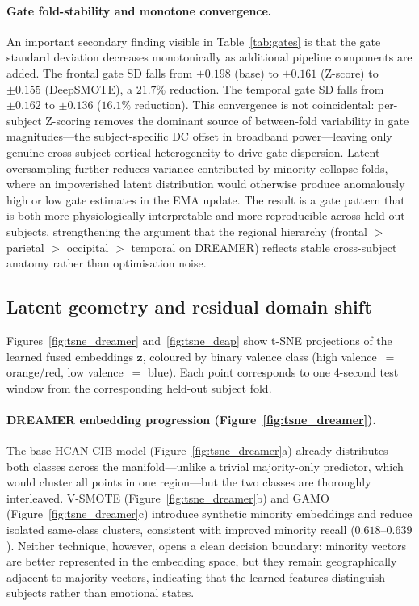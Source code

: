 \documentclass[a4paper,fleqn]{cas-sc}
\begin{document}
\paragraph{Gate fold-stability and monotone convergence.}
An important secondary finding visible in Table~\ref{tab:gates} is that the gate standard deviation decreases monotonically as additional pipeline components are added. The frontal gate SD falls from $\pm0.198$ (base) to $\pm0.161$ (Z-score) to $\pm0.155$ (DeepSMOTE), a $21.7\%$ reduction. The temporal gate SD falls from $\pm0.162$ to $\pm0.136$ ($16.1\%$ reduction). This convergence is not coincidental: per-subject Z-scoring removes the dominant source of between-fold variability in gate magnitudes---the subject-specific DC offset in broadband power---leaving only genuine cross-subject cortical heterogeneity to drive gate dispersion. Latent oversampling further reduces variance contributed by minority-collapse folds, where an impoverished latent distribution would otherwise produce anomalously high or low gate estimates in the EMA update. The result is a gate pattern that is both more physiologically interpretable and more reproducible across held-out subjects, strengthening the argument that the regional hierarchy (frontal $>$ parietal $>$ occipital $>$ temporal on DREAMER) reflects stable cross-subject anatomy rather than optimisation noise.

\FloatBarrier

\subsection{Latent geometry and residual domain shift}

Figures~\ref{fig:tsne_dreamer} and~\ref{fig:tsne_deap} show t-SNE projections of the learned fused embeddings $\mathbf{z}$, coloured by binary valence class (high valence~$=$ orange/red, low valence~$=$ blue). Each point corresponds to one 4-second test window from the corresponding held-out subject fold.

\paragraph{DREAMER embedding progression (Figure~\ref{fig:tsne_dreamer}).}
The base HCAN-CIB model (Figure~\ref{fig:tsne_dreamer}a) already distributes both classes across the manifold---unlike a trivial majority-only predictor, which would cluster all points in one region---but the two classes are thoroughly interleaved. V-SMOTE (Figure~\ref{fig:tsne_dreamer}b) and GAMO (Figure~\ref{fig:tsne_dreamer}c) introduce synthetic minority embeddings and reduce isolated same-class clusters, consistent with improved minority recall ($0.618$--$0.639$). Neither technique, however, opens a clean decision boundary: minority vectors are better represented in the embedding space, but they remain geographically adjacent to majority vectors, indicating that the learned features distinguish subjects rather than emotional states.
\end{document}
